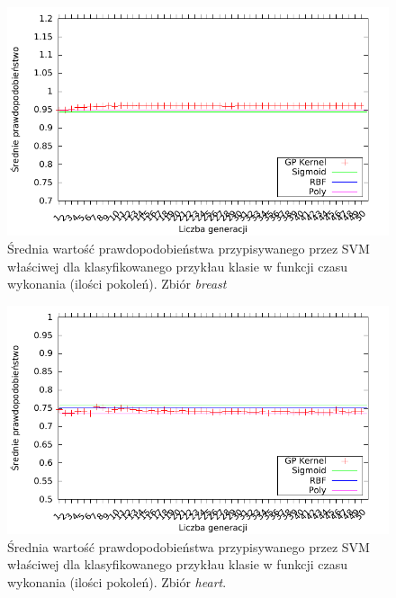 	\begin{figure}
		\includegraphics[scale=0.90]{figures/results/probability/probability-breast}
		\caption{Średnia wartość prawdopodobieństwa przypisywanego przez SVM właściwej dla klasyfikowanego przykłau klasie w funkcji czasu wykonania (ilości pokoleń). Zbiór \emph{breast}\label{fig:probability-breast}}
	\end{figure}
	
	\begin{figure}
		\includegraphics[scale=0.90]{figures/results/probability/probability-heart}
		\caption{Średnia wartość prawdopodobieństwa przypisywanego przez SVM właściwej dla klasyfikowanego przykłau klasie w funkcji czasu wykonania (ilości pokoleń). Zbiór \emph{heart}.\label{fig:probability-heart}}
	\end{figure}
	
